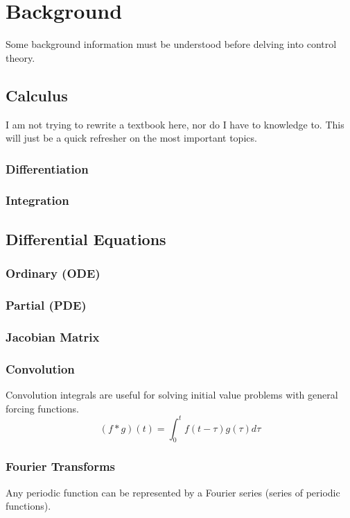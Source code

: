 \documentclass[../notes.tex]{subfiles}
\begin{document}
\section{Background}
Some background information must be understood before delving into control theory.
\subsection{Calculus}
I am not trying to rewrite a textbook here, nor do I have to knowledge to. This will just be a quick refresher on the most important topics.
\subsubsection{Differentiation}
\subsubsection{Integration}

\subsection{Differential Equations}
\subsubsection{Ordinary (ODE)}
\subsubsection{Partial (PDE)}
\subsubsection{Jacobian Matrix} \label{sec:jacobian}

\subsubsection{Convolution}
Convolution integrals are useful for solving initial value problems with general forcing functions.
\begin{equation}
    (f * g)(t) = \int_{0}^{t} f(t-\tau)g(\tau)d\tau
\end{equation}

\subsubsection{Fourier Transforms}
Any periodic function can be represented by a Fourier series (series of periodic functions).
\end{document}
